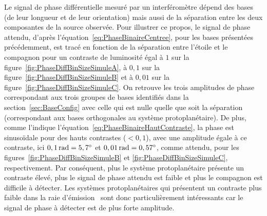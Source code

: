 Le signal de phase différentielle mesuré par un interféromètre dépend des bases (de leur longueur et de leur orientation) mais aussi de la séparation entre les deux composantes de la source observée. Pour illustrer ce propos, le signal de phase attendu, d'après l'équation~\ref{eq:PhaseBinaireCentree}, pour les bases présentées précédemment, est tracé en fonction de la séparation entre l'étoile et le compagnon pour un contraste de luminosité égal à $1$ sur la figure~\ref{fig:PhaseDiffBinSizeSimuleA}, à $0,1$ sur la figure~\ref{fig:PhaseDiffBinSizeSimuleB} et à $0,01$ sur la figure~\ref{fig:PhaseDiffBinSizeSimuleC}. On retrouve les trois amplitudes de phase correspondant aux trois groupes de bases identifiés dans la section~\ref{sec:BaseConfig} avec celle qui est nulle quelle que soit la séparation (correspondant aux bases orthogonales au système protoplanétaire). De plus, comme l'indique l'équation~\ref{eq:PhaseBinaireHautContraste}, la phase est sinusoïdale pour des hauts contrastes ($< 0,1$), avec une amplitude égale à ce contraste, ici $0,1 \, \text{rad} = 5,7^{\circ}$ et $0,01 \, \text{rad} = 0,57^{\circ}$, comme attendu, pour les figures~\ref{fig:PhaseDiffBinSizeSimuleB} et \ref{fig:PhaseDiffBinSizeSimuleC}, respectivement. Par conséquent, plus le système protoplanétaire présente un contraste élevé, plus le signal de phase attendu est faible et plus le compagnon est difficile à détecter. Les systèmes protoplanétaires qui présentent un contraste plus faible dans la raie d'émission \ha~sont donc particulièrement intéressants car le signal de phase à détecter est de plus forte amplitude.

